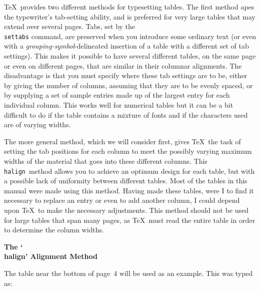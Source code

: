 \TeX\ provides two different methods for typesetting tables.  The first
method apes the typewriter's tab-setting ability, and is preferred for very
large tables that may extend over several pages.  Tabs, set by the {\tt
\\settabs} command, are preserved when you introduce some ordinary text
(or even with a {\sl grouping-symbol\/}-delineated insertion of a table
with a different set of tab settings). This makes it possible to have
several different tables, on the same page or even on different pages,
that are similar in their columnar alignments.  The disadvantage is that
you must specify where these tab settings are to be, either by giving the
number of columns, assuming that they are to be evenly spaced, or by
supplying a set of sample entries made up of the largest entry for each
individual column.  This works well for numerical tables but it
can be a bit difficult to do if the table contains a mixture of fonts and
if the characters used are of varying widths.

The more general method, which we will consider first, gives \TeX\ the
task of setting the tab positions for each column to meet the possibly
varying maximum widths of the material that goes into these different
columns.  This {\tt \\halign}\ method allows you to achieve an optimum
design for each table, but with a possible lack of uniformity
between different tables. Most of the tables in this
manual were made using this method. Having made these tables,
were I to find it necessary to replace an entry or even to add another column,
I could depend upon \TeX\ to make the necessary adjustments.  This method
should not be used for large tables that span many pages, as \TeX\ must read the entire table in
order to determine the column widths.

{\bf The `\\halign' Alignment Method}

The table near the bottom of page~4 will be used as an example. 
This was typed as:

